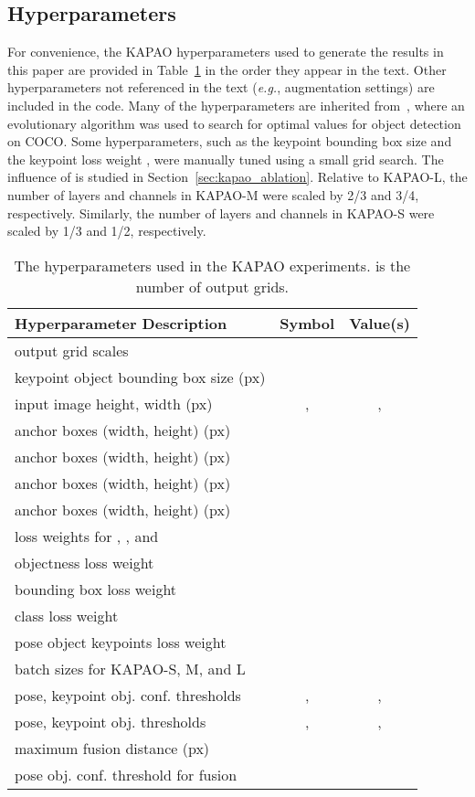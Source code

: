 \documentclass[runningheads]{llncs}
\newcommand{\eg}{\textit{e.g.}}
\newcommand\hll[1]{\bgroup
  \hskip0pt\color{black}#1\egroup
}
\begin{document}
\subsection{Hyperparameters}
For convenience, the KAPAO hyperparameters used to generate the results in this paper are provided in Table~\ref{tab:hyp} in the order they appear in the text. Other hyperparameters not referenced in the text (\eg, augmentation settings) are included in the code. Many of the hyperparameters are inherited from~\cite{glenn_jocher_2021_4679653}, where an evolutionary algorithm was used to search for optimal values for object detection on COCO. Some hyperparameters, such as the keypoint bounding box size  and the keypoint loss weight , were manually tuned using a small grid search. The influence of  is studied in Section~\ref{sec:kapao_ablation}. Relative to KAPAO-L, the number of layers and channels in KAPAO-M were scaled by 2/3 and 3/4, respectively. Similarly, the number of layers and channels in KAPAO-S were scaled by 1/3 and 1/2, respectively.

\begin{table}[h]
\centering
\begin{tabular}{l|c|c}
    \hline
    \hll{Hyperparameter Description} & Symbol & Value(s)\\
    \hline
    output grid scales &  & \\
    keypoint object bounding box size (px) &  & \\
    input image height, width (px) & ,  & , \\
     anchor boxes (width, height) (px) &  & \\
     anchor boxes (width, height) (px) &  & \\
     anchor boxes (width, height) (px) &  & \\
     anchor boxes (width, height) (px) &  & \\
    loss weights for ,  , and  &  & \\
    objectness loss weight &  & \\
    bounding box loss weight &  & \\
    class loss weight &  & \\
    pose object keypoints loss weight &  & \\
    batch sizes for KAPAO-S, M, and L &  & \\
    pose, keypoint obj. conf. thresholds & ,  & , \\
    pose, keypoint obj.  thresholds & ,  & , \\
    maximum fusion distance (px) &  & \\
    pose obj. conf. threshold for fusion &  & \\
    \hline
\end{tabular}
\smallskip
\caption[KAPAO hyperparameters.]{The hyperparameters used in the KAPAO experiments.  is the number of output grids.}
\label{tab:hyp}
\end{table}
\end{document}
